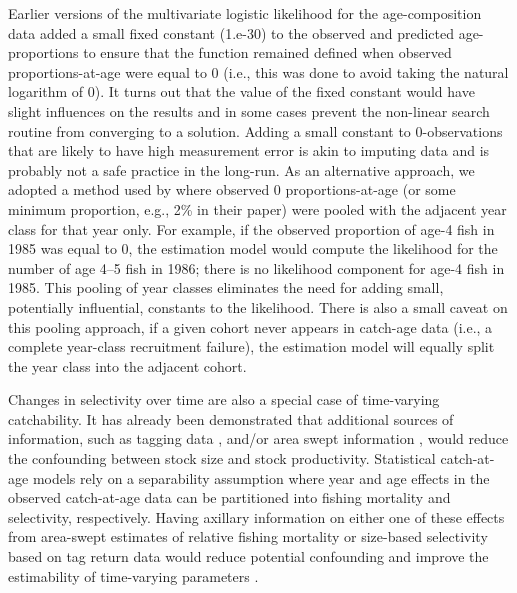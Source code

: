 Earlier versions of the multivariate logistic likelihood for the age-composition data added a small fixed constant (1.e-30) to the observed and predicted age-proportions to ensure that the function remained defined when observed proportions-at-age were equal to 0 (i.e., this was done to avoid taking the natural logarithm of 0).  It turns out that the value of the fixed constant would have slight influences on the results and in some cases prevent the non-linear search routine from converging to a solution.  Adding a small constant to 0-observations that are likely to have high measurement error is akin to imputing data and is probably not a safe practice in the long-run.  As an alternative approach, we adopted a method used by \cite{richards1997visualizing} where observed 0 proportions-at-age (or some minimum proportion, e.g., 2\% in their paper) were pooled with the adjacent year class for that year only.  For example, if the observed proportion of age-4 fish in 1985 was equal to 0, the estimation model would compute the likelihood for the number of age 4--5 fish in 1986;  there is no likelihood component for age-4 fish in 1985.  This pooling of year classes eliminates the need for adding small, potentially influential, constants to the likelihood. There is also a small caveat on this pooling approach, if a given cohort never appears in catch-age data (i.e., a complete year-class recruitment failure), the estimation model will equally split the year class into the adjacent cohort.  

Changes in selectivity over time are also a special case of time-varying catchability.  It has already been demonstrated that additional sources of information, such as tagging data \citep{martell2002implementing}, and/or area swept information \citep{winters1985interaction}, would reduce the confounding between stock size and stock productivity.  Statistical catch-at-age models rely on a separability assumption where year and age effects in the observed catch-at-age data can be partitioned into fishing mortality and selectivity, respectively.  Having axillary information on either one of these effects from area-swept estimates of relative fishing mortality or size-based selectivity based on tag return data would reduce potential confounding and improve the estimability of time-varying parameters \citep[e.g.,][]{sinclair2002disentangling}.

